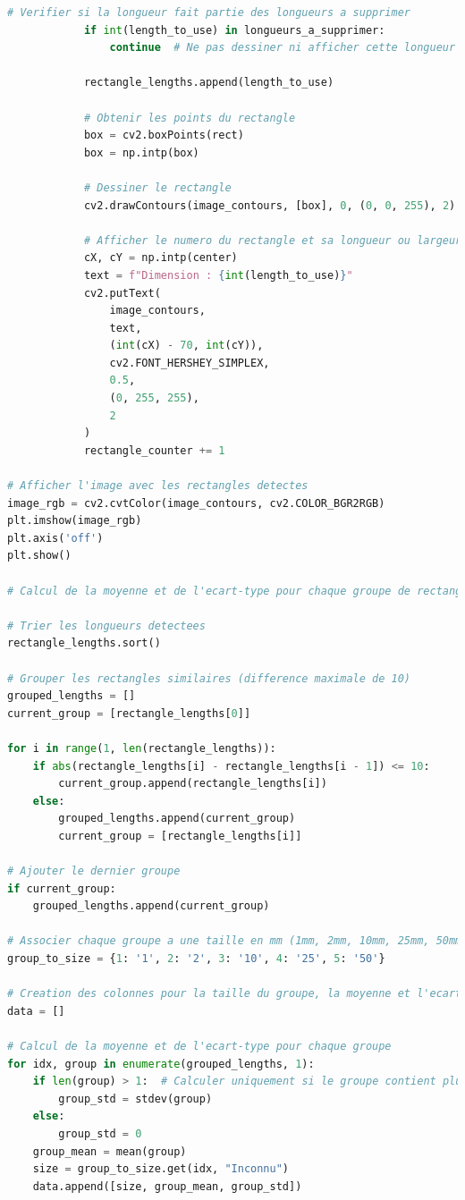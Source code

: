 \documentclass[11pt,letterpaper]{article}
\begin{document}
\begin{lstlisting}[language=python]
            # Verifier si la longueur fait partie des longueurs a supprimer
            if int(length_to_use) in longueurs_a_supprimer:
                continue  # Ne pas dessiner ni afficher cette longueur

            rectangle_lengths.append(length_to_use)

            # Obtenir les points du rectangle
            box = cv2.boxPoints(rect)
            box = np.intp(box)

            # Dessiner le rectangle
            cv2.drawContours(image_contours, [box], 0, (0, 0, 255), 2)

            # Afficher le numero du rectangle et sa longueur ou largeur sur l'image
            cX, cY = np.intp(center)
            text = f"Dimension : {int(length_to_use)}"
            cv2.putText(
                image_contours,
                text,
                (int(cX) - 70, int(cY)),
                cv2.FONT_HERSHEY_SIMPLEX,
                0.5,
                (0, 255, 255),
                2
            )
            rectangle_counter += 1

# Afficher l'image avec les rectangles detectes
image_rgb = cv2.cvtColor(image_contours, cv2.COLOR_BGR2RGB)
plt.imshow(image_rgb)
plt.axis('off')
plt.show()

# Calcul de la moyenne et de l'ecart-type pour chaque groupe de rectangles similaires

# Trier les longueurs detectees
rectangle_lengths.sort()

# Grouper les rectangles similaires (difference maximale de 10)
grouped_lengths = []
current_group = [rectangle_lengths[0]]

for i in range(1, len(rectangle_lengths)):
    if abs(rectangle_lengths[i] - rectangle_lengths[i - 1]) <= 10:
        current_group.append(rectangle_lengths[i])
    else:
        grouped_lengths.append(current_group)
        current_group = [rectangle_lengths[i]]

# Ajouter le dernier groupe
if current_group:
    grouped_lengths.append(current_group)

# Associer chaque groupe a une taille en mm (1mm, 2mm, 10mm, 25mm, 50mm)
group_to_size = {1: '1', 2: '2', 3: '10', 4: '25', 5: '50'}

# Creation des colonnes pour la taille du groupe, la moyenne et l'ecart-type
data = []

# Calcul de la moyenne et de l'ecart-type pour chaque groupe
for idx, group in enumerate(grouped_lengths, 1):
    if len(group) > 1:  # Calculer uniquement si le groupe contient plus d'un rectangle
        group_std = stdev(group)
    else:
        group_std = 0
    group_mean = mean(group)
    size = group_to_size.get(idx, "Inconnu")
    data.append([size, group_mean, group_std])


\end{lstlisting}
\end{document}
